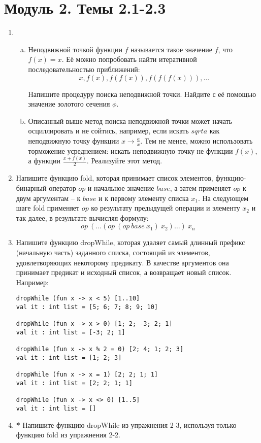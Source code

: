 \documentclass[a4paper,11pt]{article}
\begin{document}
\section*{Модуль 2. Темы 2.1-2.3}
\begin{enumerate}[{2-}1]
\item \begin{enumerate}[(a)]
\item Неподвижной точкой функции $f$ называется такое значение $f$, что 
$f(x) = x$. Её можно попробовать найти итеративной последовательностью
приближений:
\begin{equation*}
  x, f(x), f(f(x)), f(f(f(x))), \ldots
\end{equation*}

Напишите процедуру поиска неподвижной точки. Найдите с её помощью значение
золотого сечения $\phi$.

\item Описанный выше метод поиска неподвижной точки может начать осциллировать
и не сойтись, например, если искать $sqrt a$ как неподвижную точку функции
$x \rightarrow \frac{a}{x}$. Тем не менее, можно использовать торможение
усреднением: искать неподвижную точку не функции $f(x)$, а функции
$\frac{x+f(x)}{2}$. Реализуйте этот метод.
\end{enumerate}

\item Напишите функцию fold, которая принимает список элементов, 
функцию-бинарный оператор $op$ и начальное значение $base$, а затем применяет
$op$ к двум аргументам -- к $base$ и к первому элементу списка $x_1$. На
следующем шаге fold применяет $op$ ко результату предыдущей операции и элементу
$x_2$ и так далее, в результате вычисляя формулу:
\begin{equation*}
  op~(\ldots (op~(op~base~x_1)~x_2) \ldots)~x_n
\end{equation*}

\item Напишите функцию dropWhile, которая удаляет самый длинный префикс
(начальную часть) заданного списка, состоящий из элементов, удовлетворяющих
некоторому предикату. В качестве аргументов она принимает предикат и исходный
список, а возвращает новый список. Например:

\begin{lstlisting}
dropWhile (fun x -> x < 5) [1..10]
val it : int list = [5; 6; 7; 8; 9; 10]

dropWhile (fun x -> x > 0) [1; 2; -3; 2; 1]
val it : int list = [-3; 2; 1]

dropWhile (fun x -> x % 2 = 0) [2; 4; 1; 2; 3]
val it : int list = [1; 2; 3]

dropWhile (fun x -> x = 1) [2; 2; 1; 1]
val it : int list = [2; 2; 1; 1]

dropWhile (fun x -> x <> 0) [1..5]
val it : int list = []
\end{lstlisting}

\item \textbf{*} Напишите функцию dropWhile из упражнения 2-3, используя только
функцию fold из упражнения 2-2.
\end{enumerate}
\end{document}
